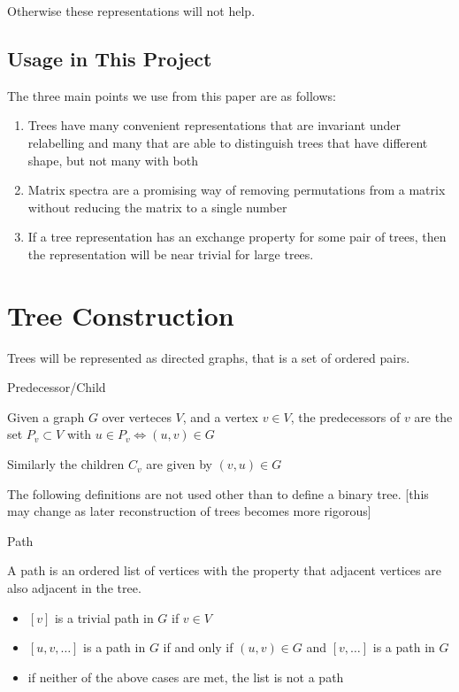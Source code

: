 \documentclass[10pt,a4paper]{report}
\begin{document}
Otherwise these representations will not help.

\section{Usage in This Project}

The three main points we use from this paper are as follows:
\begin{enumerate}
	\item Trees have many convenient representations that are invariant under
		relabelling and many that are able to distinguish trees that have
		different shape, but not many with both
	\item Matrix spectra are a promising way of removing permutations from a
		matrix without reducing the matrix to a single number
	\item If a tree representation has an exchange property for some pair of
		trees, then the representation will be near trivial for large trees.
\end{enumerate}

\chapter{Tree Construction}

Trees will be represented as directed graphs, that is a set of ordered pairs.

\begin{definition} Predecessor/Child

	Given a graph $G$ over verteces $V$, and a vertex $v \in V$, the
	predecessors of $v$ are the set $P_v \subset V$ with $u \in P_v
	\Leftrightarrow (u, v) \in G$

	Similarly the children $C_v$ are given by $(v, u) \in G$
\end{definition}

The following definitions are not used other than to define a binary tree.
[this may change as later reconstruction of trees becomes more rigorous]

\begin{definition} Path

	A path is an ordered list of vertices with the property that adjacent
	vertices are also adjacent in the tree.

	\begin{itemize}
		\item $[v]$ is a trivial path in $G$ if $v \in V$
		\item $[u, v, \ldots]$ is a path in $G$ if and only if $(u, v) \in G$
			and $[v, \ldots]$ is a path in $G$
		\item if neither of the above cases are met, the list is not a path
	\end{itemize}
\end{definition}
\end{document}
